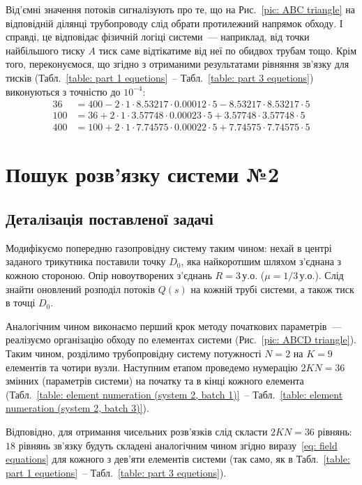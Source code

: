 \documentclass{mathreport}
\begin{document}
Від'ємні значення потоків сигналізують про те, що на Рис.~\ref{pic: ABC triangle} на відповідній ділянці трубопроводу слід обрати протилежний напрямок обходу. І справді, це відповідає фізичній логіці системи~--- наприклад, від точки найбільшого тиску $A$ тиск саме відтікатиме від неї по обидвох трубам тощо. Крім того, переконуємося, що згідно з отриманими результатами рівняння зв'язку для тисків (Табл.~\ref{table: part 1 equetions}~-- Табл.~\ref{table: part 3 equetions}) виконуються з точністю до $10^{-4}:$
\begin{align}
    36 & = 400 - 2 \cdot 1 \cdot 8.53217 \cdot 0.00012 \cdot 5 - 8.53217 \cdot 8.53217 \cdot 5 \\ 
    100 & = 36 + 2 \cdot 1 \cdot 3.57748 \cdot 0.00023 \cdot 5 + 3.57748 \cdot 3.57748 \cdot 5 \\
    400 & = 100 + 2 \cdot 1 \cdot 7.74575 \cdot 0.00022 \cdot 5 + 7.74575 \cdot 7.74575 \cdot 5
\end{align}

\section{Пошук розв'язку системи №2}

\subsection*{Деталізація поставленої задачі}

Модифікуємо попередню газопровідну систему таким чином: нехай в центрі заданого трикутника поставили точку $D_0$, яка найкоротшим шляхом з'єднана з кожною стороною. Опір новоутворених з'єднань $R = 3\,\text{у.о.}$ ($\mu = 1/3\,\text{у.о.}$). Слід знайти оновлений розподіл потоків $Q(s)$ на кожній трубі системи, а також тиск в точці $D_0$.

Аналогічним чином виконаємо перший крок методу початкових параметрів~--- реалізуємо організацію обходу по елементах системи (Рис.~\ref{pic: ABCD triangle}). Таким чином, розділимо трубопровідну систему потужності $N=2$ на $K=9$ елементів та чотири вузли. Наступним етапом проведемо нумерацію $2KN=36$ змінних (параметрів системи) на початку та в кінці кожного елемента (Табл.~\ref{table: element numeration (system 2, batch 1)}~-- Табл.~\ref{table: element numeration (system 2, batch 3)}).

Відповідно, для отримання чисельних розв'язків слід скласти $2KN=36$ рівнянь: $18$ рівнянь зв'язку будуть складені аналогічним чином згідно виразу~\eqref{eq: field equations} для кожного з дев'яти елементів системи (так само, як в Табл.~\ref{table: part 1 equetions}~-- Табл.~\ref{table: part 3 equetions}). 
\end{document}
